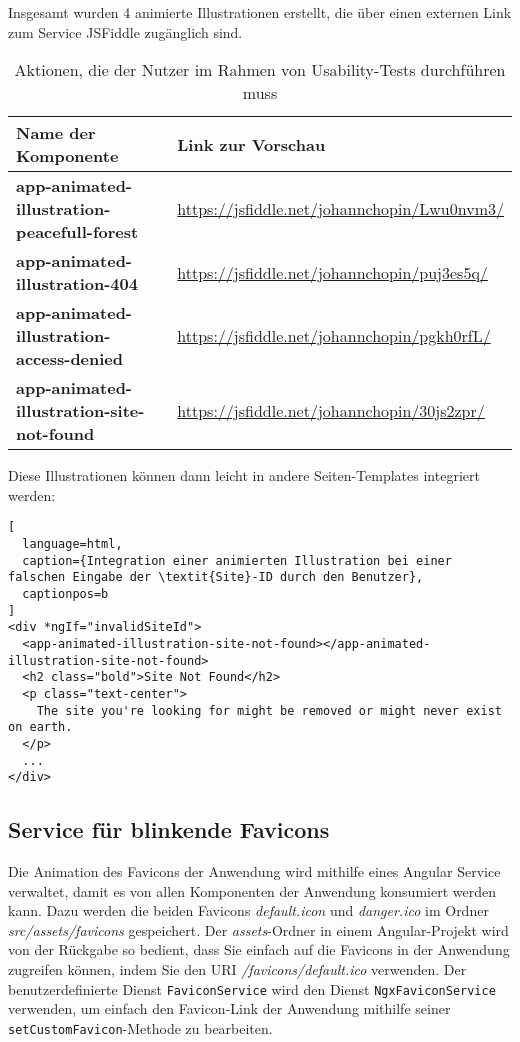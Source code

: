 Insgesamt wurden 4 animierte Illustrationen erstellt, die über einen externen Link zum Service JSFiddle zugänglich sind.

\begin{table}[H]
  \begin{tabular}{p{0.5\linewidth} | p{0.5\linewidth}}
    Name der Komponente                                 & Link zur Vorschau                                                                               \\ \hline\hline

    \textbf{app-animated-illustration-peacefull-forest} & \href{https://jsfiddle.net/johannchopin/Lwu0nvm3/}{https://jsfiddle.net/johannchopin/Lwu0nvm3/} \\\hline
    \textbf{app-animated-illustration-404}              & \href{https://jsfiddle.net/johannchopin/puj3es5q/}{https://jsfiddle.net/johannchopin/puj3es5q/} \\\hline
    \textbf{app-animated-illustration-access-denied}    & \href{https://jsfiddle.net/johannchopin/pgkh0rfL/}{https://jsfiddle.net/johannchopin/pgkh0rfL/} \\\hline
    \textbf{app-animated-illustration-site-not-found}   & \href{https://jsfiddle.net/johannchopin/30js2zpr/}{https://jsfiddle.net/johannchopin/30js2zpr/}
  \end{tabular}
  \caption{Aktionen, die der Nutzer im Rahmen von Usability-Tests durchführen muss}
\end{table}

Diese Illustrationen können dann leicht in andere Seiten-Templates integriert werden:

\begin{lstlisting}[
  language=html,
  caption={Integration einer animierten Illustration bei einer falschen Eingabe der \textit{Site}-ID durch den Benutzer},
  captionpos=b
]
<div *ngIf="invalidSiteId">
  <app-animated-illustration-site-not-found></app-animated-illustration-site-not-found>
  <h2 class="bold">Site Not Found</h2>
  <p class="text-center">
    The site you're looking for might be removed or might never exist on earth.
  </p>
  ...
</div>
\end{lstlisting}


\subsection{Service für blinkende Favicons}

Die Animation des Favicons der Anwendung wird mithilfe eines Angular Service verwaltet, damit es von allen Komponenten der Anwendung konsumiert werden kann.
Dazu werden die beiden Favicons \textit{default.icon} und \textit{danger.ico} im Ordner \textit{src/assets/favicons} gespeichert.
Der \textit{assets}-Ordner in einem Angular-Projekt wird von der Rückgabe so bedient, dass Sie einfach auf die Favicons in der Anwendung zugreifen können, indem Sie den URI \textit{/favicons/default.ico} verwenden.
Der benutzerdefinierte Dienst \lstinline{FaviconService} wird den Dienst \lstinline{NgxFaviconService} verwenden, um einfach den Favicon-Link der Anwendung mithilfe seiner \lstinline{setCustomFavicon}-Methode zu bearbeiten.

